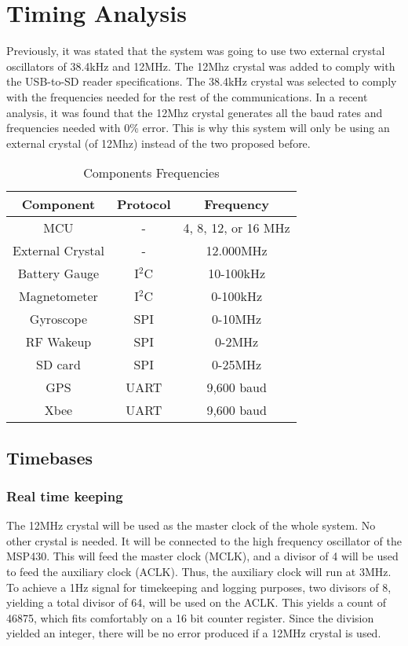 \section{Timing Analysis}

Previously, it was stated that the system was going to use two external crystal oscillators of 38.4kHz and 12MHz. The 12Mhz crystal was added to comply with the USB-to-SD reader specifications.  The 38.4kHz crystal was selected to comply with the frequencies needed for the rest of the communications. In a recent analysis, it was found that the 12Mhz crystal generates all the baud rates and frequencies needed with 0\% error. This is why this system will only be using an external crystal (of 12Mhz) instead of the two proposed before.   

\begin{table}[H]
  \centering
  \caption{Components Frequencies}
    \begin{tabular}{|c|c|c|}
    \hline
    \rowcolor{Gray}
    Component & Protocol & Frequency \\
    \hline \hline
    MCU   & -     & 4, 8, 12, or 16 MHz \\ \hline
    External Crystal & -     & 12.000MHz \\ \hline
    Battery Gauge & I$^2$C & 10-100kHz \\ \hline
    Magnetometer & I$^2$C & 0-100kHz \\ \hline
    Gyroscope & SPI   & 0-10MHz \\ \hline
    RF Wakeup & SPI   & 0-2MHz \\ \hline
    SD card & SPI   & 0-25MHz \\ \hline
    GPS   & UART  & 9,600 baud \\ \hline
    Xbee  & UART   & 9,600 baud \\ \hline
    \end{tabular}%
  \label{tab:compFreq}%
\end{table}%

\subsection{Timebases}
\subsubsection{Real time keeping}
The 12MHz crystal will be used as the master clock of the whole system. No other crystal is needed. It will be connected to the high frequency oscillator of the MSP430. This will feed the master clock (MCLK), and a divisor of 4 will be used to feed the auxiliary clock (ACLK). Thus, the auxiliary clock will run at 3MHz. To achieve a 1Hz signal for timekeeping and logging purposes, two divisors of 8, yielding a total divisor of 64, will be used on the ACLK. This yields a count of 46875, which fits comfortably on a 16 bit counter register. Since the division yielded an integer, there will be no error produced if a 12MHz crystal is used.

